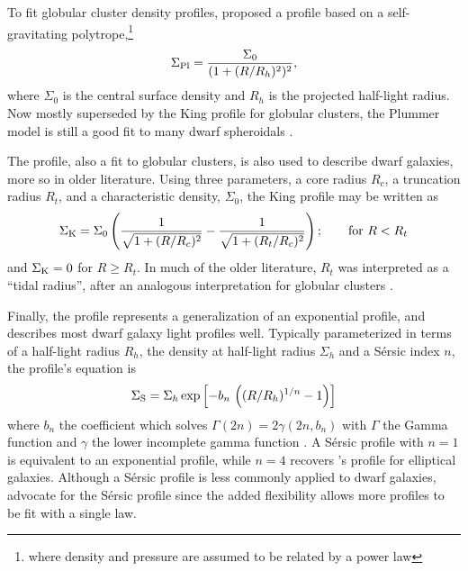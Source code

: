 To fit globular cluster density profiles, \citet{plummer1911} proposed a
profile based on a self-gravitating polytrope,\footnote{where density
  and pressure are assumed to be related by a power law}
\begin{equation}{
\Sigma_{\rm Pl} = \frac{\Sigma_0}{(1 + (R/R_h)^2)^2},
}\end{equation} where \(\Sigma_0\) is the central surface density and
\(R_h\) is the projected half-light radius. Now mostly superseded by the
King profile for globular clusters, the Plummer model is still a good
fit to many dwarf spheroidals \citep[e.g.,][]{moskowitz+walker2020}.

The \citet{king1962} profile, also a fit to globular clusters, is also
used to describe dwarf galaxies, more so in older literature. Using
three parameters, a core radius \(R_c\), a truncation radius \(R_t\),
and a characteristic density, \(\Sigma_0\), the King profile may be
written as \begin{equation}{
\Sigma_{\rm K} = \Sigma_0\left(\frac{1}{\sqrt{1 + (R/R_c)^2}} - \frac{1}{\sqrt{1+(R_t/R_c)^2}}\right); \qquad \text{for } R<R_t
}\end{equation} and \(\Sigma_{\rm K}=0\) for \(R \geq R_t\). In much of
the older literature, \(R_t\) was interpreted as a ``tidal radius'',
after an analogous interpretation for globular clusters
\citep[e.g.,][]{hodge1961, IH1995}.

Finally, the \citet{sersic1963} profile represents a generalization of
an exponential profile, and describes most dwarf galaxy light profiles
well. Typically parameterized in terms of a half-light radius \(R_h\),
the density at half-light radius \(\Sigma_h\) and a Sérsic index \(n\),
the profile's equation is \begin{equation}{
\Sigma_{\rm S} = \Sigma_h \exp\left[-b_n \,  \left((R/R_h)^{1/n} - 1\right)\right]
}\end{equation} where \(b_n\) the coefficient which solves
\(\Gamma(2n) = 2\gamma(2n, b_n)\) with \(\Gamma\) the Gamma function and
\(\gamma\) the lower incomplete gamma function
\citep{graham+driver2005}. A Sérsic profile with \(n=1\) is equivalent
to an exponential profile, while \(n=4\) recovers
\citet{devaucouleurs1948}'s profile for elliptical galaxies. Although a
Sérsic profile is less commonly applied to dwarf galaxies,
\citet{munoz+2018} advocate for the Sérsic profile since the added
flexibility allows more profiles to be fit with a single law.

